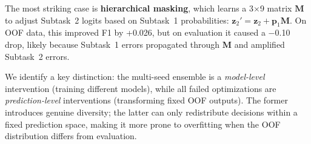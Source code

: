 \documentclass[11pt]{article}
\begin{document}
\begin{table}[t]
\centering
{}
\caption{The optimization paradox. OOF~$\Delta$ vs.\ single-model mean (xlarge for T1, v3-large for T2); Eval~$\Delta$ vs.\ our single-seed v3-large submission (the only pre-ensemble submission for either subtask). The +0.22 T1 entry therefore conflates architecture (v3-large~$\rightarrow$~xlarge) and ensembling effects and is an upper bound on the pure ensembling contribution; prediction-level rows all use the same ensemble backbone and cleanly isolate calibration effects.}
\label{tab:paradox}
\end{table}

The most striking case is \textbf{hierarchical masking}, which learns a 3$\times$9 matrix $\mathbf{M}$ to adjust Subtask~2 logits based on Subtask~1 probabilities: $\mathbf{z}_2' {=} \mathbf{z}_2 {+} \mathbf{p}_1 \mathbf{M}$. On OOF data, this improved F1 by +0.026, but on evaluation it caused a $-$0.10 drop, likely because Subtask~1 errors propagated through $\mathbf{M}$ and amplified Subtask~2 errors.

We identify a key distinction: the multi-seed ensemble is a \textit{model-level} intervention (training different models), while all failed optimizations are \textit{prediction-level} interventions (transforming fixed OOF outputs). The former introduces genuine diversity; the latter can only redistribute decisions within a fixed prediction space, making it more prone to overfitting when the OOF distribution differs from evaluation.
\end{document}
